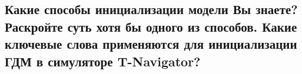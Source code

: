 

\subsection{Какие способы инициализации модели Вы знаете? Раскройте суть хотя бы одного из способов. Какие ключевые слова применяются для инициализации ГДМ в симуляторе T-Navigator?}

